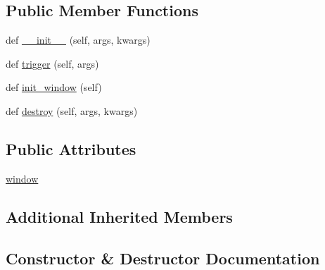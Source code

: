 \subsection*{Public Member Functions}
\begin{DoxyCompactItemize}
\item 
def \hyperlink{classmatplotlib_1_1backends_1_1__backend__tk_1_1ConfigureSubplotsTk_a7395536d9402c2d8831b3ba8ba98201c}{\+\_\+\+\_\+init\+\_\+\+\_\+} (self, args, kwargs)
\item 
def \hyperlink{classmatplotlib_1_1backends_1_1__backend__tk_1_1ConfigureSubplotsTk_a33f52b72becafb88332092f0ebc21f2e}{trigger} (self, args)
\item 
def \hyperlink{classmatplotlib_1_1backends_1_1__backend__tk_1_1ConfigureSubplotsTk_a2cab7829cff7a95f46f1d9f379b884c5}{init\+\_\+window} (self)
\item 
def \hyperlink{classmatplotlib_1_1backends_1_1__backend__tk_1_1ConfigureSubplotsTk_a8d06be1cac9efe0e0e8e114486dc3763}{destroy} (self, args, kwargs)
\end{DoxyCompactItemize}
\subsection*{Public Attributes}
\begin{DoxyCompactItemize}
\item 
\hyperlink{classmatplotlib_1_1backends_1_1__backend__tk_1_1ConfigureSubplotsTk_af02cc795f9069a88f217157c5e31751a}{window}
\end{DoxyCompactItemize}
\subsection*{Additional Inherited Members}


\subsection{Constructor \& Destructor Documentation}
\mbox{\label{classmatplotlib_1_1backends_1_1__backend__tk_1_1ConfigureSubplotsTk_a7395536d9402c2d8831b3ba8ba98201c}} 
